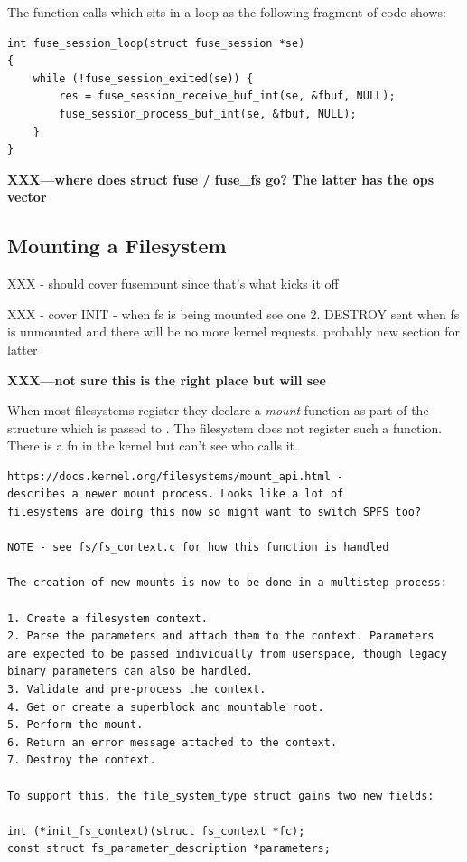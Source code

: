 \noindent
The  function calls  which sits in a loop as the following fragment of code shows:

\begin{lstlisting}
int fuse_session_loop(struct fuse_session *se)
{
    while (!fuse_session_exited(se)) {
        res = fuse_session_receive_buf_int(se, &fbuf, NULL);
        fuse_session_process_buf_int(se, &fbuf, NULL); 
    }
}
\end{lstlisting}

\noindent
\textbf{XXX---where does struct fuse / fuse\_fs go? The latter has the ops vector}



\subsection{Mounting a  Filesystem}

XXX - should cover fusemount since that's what kicks it off

XXX - cover INIT - when fs is being mounted see one 2. DESTROY sent when fs is unmounted and there will be no more kernel requests. probably new section for latter

\textbf{XXX---not sure this is the right place but will see}

When most filesystems register they declare a \textit{mount} function as part of the  structure which is passed to . The  filesystem does not register such a function. There is a fn  in the kernel but can't see who calls it.

\begin{lstlisting}
https://docs.kernel.org/filesystems/mount_api.html - 
describes a newer mount process. Looks like a lot of 
filesystems are doing this now so might want to switch SPFS too?

NOTE - see fs/fs_context.c for how this function is handled

The creation of new mounts is now to be done in a multistep process:

1. Create a filesystem context.
2. Parse the parameters and attach them to the context. Parameters 
are expected to be passed individually from userspace, though legacy 
binary parameters can also be handled.
3. Validate and pre-process the context.
4. Get or create a superblock and mountable root.
5. Perform the mount.
6. Return an error message attached to the context.
7. Destroy the context.

To support this, the file_system_type struct gains two new fields:

int (*init_fs_context)(struct fs_context *fc);
const struct fs_parameter_description *parameters;
\end{lstlisting}

